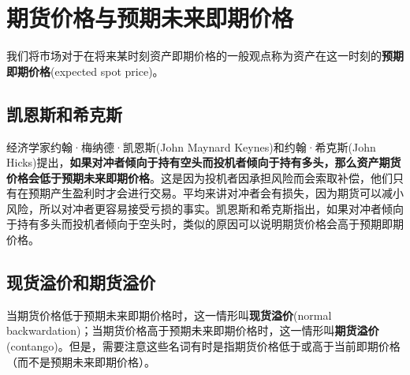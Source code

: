 \section{期货价格与预期未来即期价格}
我们将市场对于在将来某时刻资产即期价格的一般观点称为资产在这一时刻的\textbf{预期即期价格}(expected spot price)。
\subsection{凯恩斯和希克斯}
经济学家约翰·梅纳德·凯恩斯(John Maynard Keynes)和约翰·希克斯(John Hicks)提出，\textbf{如果对冲者倾向于持有空头而投机者倾向于持有多头，那么资产期货价格会低于预期未来即期价格}。这是因为投机者因承担风险而会索取补偿，他们只有在预期产生盈利时才会进行交易。平均来讲对冲者会有损失，因为期货可以减小风险，所以对冲者更容易接受亏损的事实。凯恩斯和希克斯指出，如果对冲者倾向于持有多头而投机者倾向于空头时，类似的原因可以说明期货价格会高于预期即期价格。
\subsection{现货溢价和期货溢价}
当期货价格低于预期未来即期价格时，这一情形叫\textbf{现货溢价}(normal backwardation)；当期货价格高于预期未来即期价格时，这一情形叫\textbf{期货溢价}(contango)。但是，需要注意这些名词有时是指期货价格低于或高于当前即期价格（而不是预期未来即期价格）。